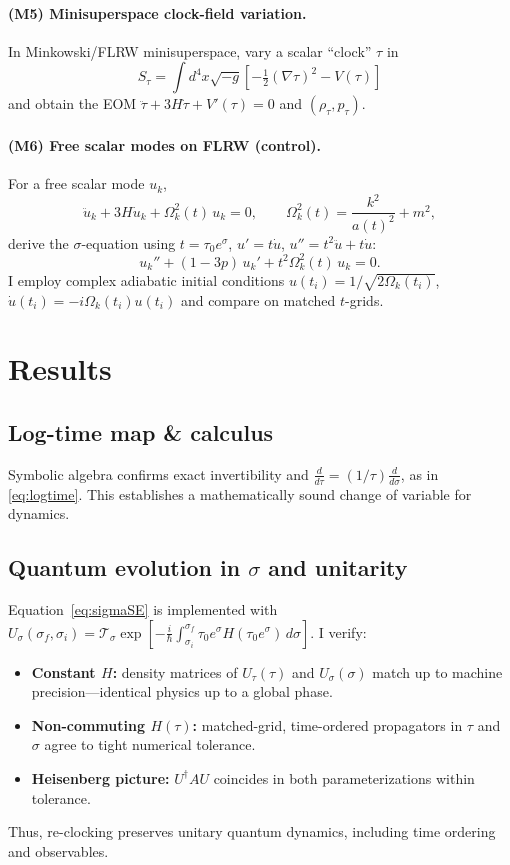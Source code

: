 \documentclass[11pt]{article}
\begin{document}
\paragraph{(M5) Minisuperspace clock-field variation.}
In Minkowski/FLRW minisuperspace, vary a scalar ``clock'' $\tau$ in
\[
S_\tau=\int d^4x \sqrt{-g}\left[-\tfrac12 (\nabla\tau)^2 - V(\tau)\right]
\]
and obtain the EOM $\ddot\tau+3H\dot\tau+V'(\tau)=0$ and $(\rho_\tau,p_\tau)$.

\paragraph{(M6) Free scalar modes on FLRW (control).}
For a free scalar mode $u_k$,
\begin{equation}
\ddot u_k + 3H\dot u_k + \Omega_k^2(t)\,u_k=0,
\qquad
\Omega_k^2(t)=\frac{k^2}{a(t)^2}+m^2,
\label{eq:mode-t}
\end{equation}
derive the $\sigma$-equation using $t=\tau_0 e^{\sigma}$, $u' = t\dot u$, $u''=t^2\ddot u+t\dot u$:
\begin{equation}
u_k'' + (1-3p)\,u_k' + t^2\Omega_k^2(t)\,u_k=0.
\label{eq:mode-sigma}
\end{equation}
I employ complex adiabatic initial conditions $u(t_i)=1/\sqrt{2\Omega_k(t_i)}$, $\dot u(t_i)=-i\Omega_k(t_i)u(t_i)$ and compare on matched $t$-grids.

\section{Results}

\subsection{Log-time map \& calculus}
Symbolic algebra confirms exact invertibility and $\frac{d}{d\tau}=(1/\tau)\frac{d}{d\sigma}$, as in \eqref{eq:logtime}. This establishes a mathematically sound change of variable for dynamics.

\subsection{Quantum evolution in $\sigma$ and unitarity}
Equation~\eqref{eq:sigmaSE} is implemented with $U_\sigma(\sigma_f,\sigma_i)=\mathcal{T}_\sigma\exp\!\left[-\tfrac{i}{\hbar}\int_{\sigma_i}^{\sigma_f} \tau_0 e^{\sigma}H(\tau_0e^{\sigma})\,d\sigma\right]$. I verify:
\begin{itemize}[leftmargin=1.25em]
\item \textbf{Constant $H$:} density matrices of $U_\tau(\tau)$ and $U_\sigma(\sigma)$ match up to machine precision---identical physics up to a global phase.
\item \textbf{Non-commuting $H(\tau)$:} matched-grid, time-ordered propagators in $\tau$ and $\sigma$ agree to tight numerical tolerance. 
\item \textbf{Heisenberg picture:} $U^\dagger A U$ coincides in both parameterizations within tolerance.
\end{itemize}
Thus, re-clocking preserves unitary quantum dynamics, including time ordering and observables.
\end{document}
